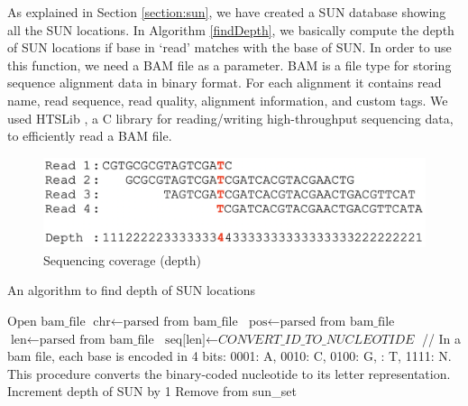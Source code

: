 As explained in Section \ref{section:sun}, we have created a SUN database showing all the SUN locations. In Algorithm \ref{findDepth}, we basically compute the depth of SUN locations if base in `read' matches with the base of SUN. In order to use this function, we need a BAM file as a parameter. BAM \cite{li2009sequence} is a file type for storing sequence alignment data in binary format. For each alignment it contains read name, read sequence, read quality, alignment information, and custom tags. We used HTSLib \cite{htslib}, a C library for reading/writing high-throughput sequencing data, to efficiently read a BAM file.
\begin{figure}[ht]
    \centering
    \includegraphics[scale=0.4]{images/depthofcoverage.png}
    \caption{Sequencing coverage (depth)}
    \label{depthOfCoverage}
\end{figure}
\begin{algorithm}
\caption{An algorithm to find depth of SUN locations}
\label{findDepth}
\begin{algorithmic}[1]
\State $\text{Open bam\_file}$
\State $\text{chr} \gets \text{parsed from bam\_file}$
\State $\text{pos} \gets \text{parsed from bam\_file}$
\State $\text{len} \gets \text{parsed from bam\_file}$
\State $\text{seq[len]} \gets \textit{CONVERT\_ID\_TO\_NUCLEOTIDE}$ // In a bam file, 
\State each base is encoded in 4 bits: 0001: A, 0010: C, 0100: G, 
: T, 1111: N. This procedure converts the binary-coded 
\State nucleotide to its letter representation.
\State Increment depth of SUN by 1
\Else
\State Remove from sun\_set
\EndIf
\EndFor
\EndFor
\EndIf
\EndProcedure
\end{algorithmic}
\end{algorithm}

